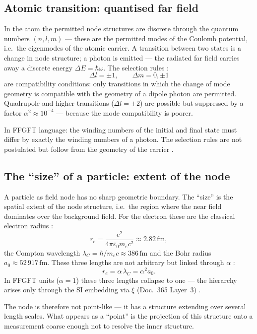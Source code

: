\subsection*{Atomic transition: quantised far field}

In the atom the permitted node structures are discrete through the quantum
numbers $(n, l, m)$ --- these are the permitted modes of the Coulomb
potential, i.e.\ the eigenmodes of the atomic carrier. A transition between
two states is a change in node structure; a photon is emitted --- the
radiated far field carries away a discrete energy $\Delta E = \hbar\omega$.
The selection rules \cite{CohenTannoudji1977,Griffiths1995}:
\[
  \Delta l = \pm 1, \qquad \Delta m = 0,\pm 1
\]
are compatibility conditions: only transitions in which the change of mode
geometry is compatible with the geometry of a dipole photon are permitted.
Quadrupole and higher transitions ($\Delta l = \pm 2$) are possible but
suppressed by a factor $\alpha^2 \approx 10^{-4}$ --- because the mode
compatibility is poorer.

In FFGFT language: the winding numbers of the initial and final state must
differ by exactly the winding numbers of a photon. The selection rules are
not postulated but follow from the geometry of the carrier \SM.

\subsection*{The ``size'' of a particle: extent of the node}

A particle as field node has no sharp geometric boundary. The ``size'' is
the spatial extent of the node structure, i.e.\ the region where the near
field dominates over the background field. For the electron these are the
classical electron radius \EM:
\[
  r_e = \frac{e^2}{4\pi\varepsilon_0 m_e c^2} \approx 2.82\,\mathrm{fm},
\]
the Compton wavelength $\lambda_C = \hbar/m_e c \approx 386\,\mathrm{fm}$
and the Bohr radius $a_0 \approx 52\,917\,\mathrm{fm}$. These three lengths
are not arbitrary but linked through $\alpha$ \cite{Jackson1999,PascherDok365}:
\[
  r_e = \alpha\,\lambda_C = \alpha^2 a_0.
\]
In FFGFT units ($\alpha=1$) these three lengths collapse to one --- the
hierarchy arises only through the SI embedding via $\xi$ (Doc.~365
Layer~3) \KM.

The node is therefore not point-like --- it has a structure extending over
several length scales. What appears as a ``point'' is the projection of
this structure onto a measurement coarse enough not to resolve the inner
structure.

